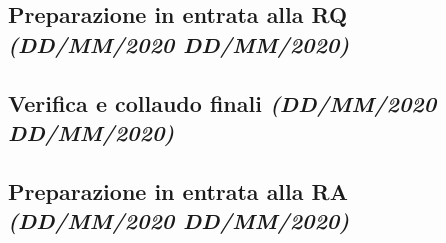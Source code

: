 \documentclass[../piano-di-progetto.tex]{subfiles}
\begin{document}
\subsection[Preparazione in entrata alla RQ]{Preparazione in entrata alla RQ {\normalsize\normalfont\itshape(DD/MM/2020  DD/MM/2020)}}%
\label{sub:preparazione_in_entrata_alla_rq}

\subsection[Verifica e collaudo finali]{Verifica e collaudo finali {\normalsize\normalfont\itshape(DD/MM/2020  DD/MM/2020)}}%
\label{sub:verifica_e_collaudo_finali}

\subsection[Preparazione in entrata alla RA]{Preparazione in entrata alla RA {\normalsize\normalfont\itshape(DD/MM/2020  DD/MM/2020)}}%
\label{sub:preparazione_in_entrata_alla_ra}

\end{document}
